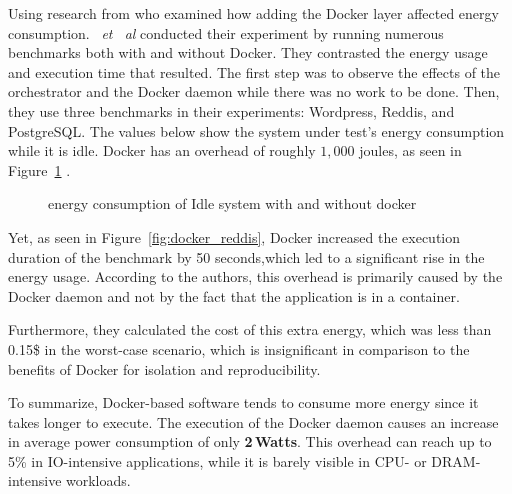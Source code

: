 Using research from \cite{santos2018does} who examined how adding the Docker layer affected energy consumption. \citeauthor{santos2018does}~\emph{et~ al} conducted their experiment by running numerous benchmarks both with and without Docker. They contrasted the energy usage and execution time that resulted.
The first step was to observe the effects of the orchestrator and the Docker daemon while there was no work to be done.
Then, they use three benchmarks in their experiments: Wordpress, Reddis, and PostgreSQL.
The values below show the system under test's energy consumption while it is idle.
Docker has an overhead of roughly $1,000$  joules, as seen in Figure~\ref{fig:docker_idle} .


\begin{figure}
    \caption{energy consumption of Idle system with and without docker \cite{santos2018does}}\label{fig:docker_idle}
\end{figure}

Yet, as seen in Figure~\ref{fig:docker_reddis}, Docker increased the execution duration of the benchmark by 50 seconds,which led to a significant rise in the energy usage.
According to the authors, this overhead is primarily caused by the Docker daemon and not by the fact that  the application is in a container.


Furthermore, they calculated the cost of this extra energy, which was less than 0.15\$ in the worst-case scenario, which is insignificant in comparison to the benefits of Docker for isolation and reproducibility.

To summarize, Docker-based software tends to consume more energy since it takes longer to execute.
The execution of the Docker daemon causes an increase in average power consumption of only \textbf{2\,Watts}.
This overhead can reach up to 5\% in IO-intensive applications, while it is barely visible in CPU- or DRAM-intensive workloads.



